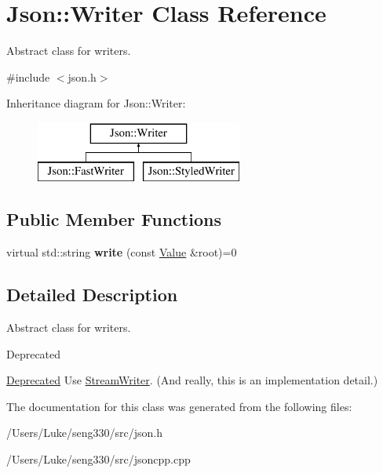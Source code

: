 \hypertarget{class_json_1_1_writer}{}\section{Json\+:\+:Writer Class Reference}
\label{class_json_1_1_writer}


Abstract class for writers.  




{\ttfamily \#include $<$json.\+h$>$}

Inheritance diagram for Json\+:\+:Writer\+:\begin{figure}[H]
\begin{center}
\leavevmode
\includegraphics[height=2.000000cm]{class_json_1_1_writer}
\end{center}
\end{figure}
\subsection*{Public Member Functions}
\begin{DoxyCompactItemize}
\item 
\hypertarget{class_json_1_1_writer_a7b2273a4ffd6f32b369ac8a53b7b5a0d}{}virtual std\+::string {\bfseries write} (const \hyperlink{class_json_1_1_value}{Value} \&root)=0\label{class_json_1_1_writer_a7b2273a4ffd6f32b369ac8a53b7b5a0d}

\end{DoxyCompactItemize}


\subsection{Detailed Description}
Abstract class for writers. 

\begin{DoxyRefDesc}{Deprecated}
\item[\hyperlink{deprecated__deprecated000007}{Deprecated}]Use \hyperlink{class_json_1_1_stream_writer}{Stream\+Writer}. (And really, this is an implementation detail.) \end{DoxyRefDesc}


The documentation for this class was generated from the following files\+:\begin{DoxyCompactItemize}
\item 
/\+Users/\+Luke/seng330/src/json.\+h\item 
/\+Users/\+Luke/seng330/src/jsoncpp.\+cpp\end{DoxyCompactItemize}
